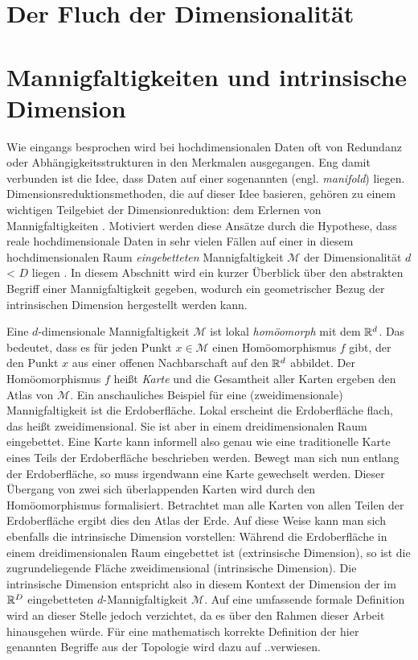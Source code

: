 \section{Der Fluch der Dimensionalität}
\label{ch:Dimensionsreduktion:FluchDerDim}

\section{Mannigfaltigkeiten und intrinsische Dimension}
\label{ch:Dimensionsreduktion:MannigfaltigkeitenIntrinsDim}

Wie eingangs besprochen wird bei hochdimensionalen Daten oft von Redundanz oder
Abhängigkeitsstrukturen in den Merkmalen ausgegangen. Eng damit verbunden ist die Idee, dass Daten
auf einer sogenannten  (engl. \textit{manifold}) liegen.
Dimensionsreduktionsmethoden, die auf dieser Idee basieren, gehören zu einem wichtigen Teilgebiet
der Dimensionreduktion: dem Erlernen von Mannigfaltigkeiten \parencite{Cayton.2005}. Motiviert werden diese Ansätze durch die Hypothese, dass reale
hochdimensionale Daten in sehr vielen Fällen auf einer in diesem hochdimensionalen Raum
\textit{eingebetteten} Mannigfaltigkeit $\mathcal{M}$ der Dimensionalität $d$ < $D$ liegen \parencite[vgl.][1]{Cayton.2005}. In diesem Abschnitt wird ein kurzer Überblick über den abstrakten
Begriff einer Mannigfaltigkeit gegeben, wodurch ein geometrischer Bezug der intrinsischen Dimension
hergestellt werden kann.

Eine $d$-dimensionale Mannigfaltigkeit $\mathcal{M}$ ist lokal \textit{homöomorph} mit dem
$\mathbb{R}^d$. Das bedeutet, dass es für jeden Punkt $x \in \mathcal{M}$ einen Homöomorphismus $f$
gibt, der den Punkt $x$ aus einer offenen Nachbarschaft auf den $\mathbb{R}^d$ abbildet. Der
Homöomorphismus $f$ heißt \textit{Karte} und die Gesamtheit aller Karten ergeben den Atlas von
$\mathcal{M}$. Ein anschauliches Beispiel für eine (zweidimensionale) Mannigfaltigkeit ist die
Erdoberfläche. Lokal erscheint die Erdoberfläche flach, das heißt zweidimensional. Sie ist aber in
einem dreidimensionalen Raum eingebettet. Eine Karte kann informell also genau wie eine
traditionelle Karte eines Teils der Erdoberfläche beschrieben werden. Bewegt man sich nun entlang
der Erdoberfläche, so muss irgendwann eine Karte gewechselt werden. Dieser Übergang von zwei sich
überlappenden Karten wird durch den Homöomorphismus formalisiert. Betrachtet man alle Karten von
allen Teilen der Erdoberfläche ergibt dies den Atlas der Erde. Auf diese Weise kann man sich
ebenfalls die intrinsische Dimension vorstellen: Während die Erdoberfläche in einem
dreidimensionalen Raum eingebettet ist (extrinsische Dimension), so ist die zugrundeliegende Fläche
zweidimensional (intrinsische Dimension). Die intrinsische Dimension entspricht also in diesem
Kontext der Dimension der im $\mathbb{R}^D$ eingebetteten $d$-Mannigfaltigkeit $\mathcal{M}$. Auf eine
umfassende formale Definition wird an dieser Stelle jedoch verzichtet, da es über den Rahmen dieser
Arbeit hinausgehen würde. Für eine mathematisch korrekte Definition der hier genannten Begriffe aus
der Topologie wird dazu auf ..\addref verwiesen.

